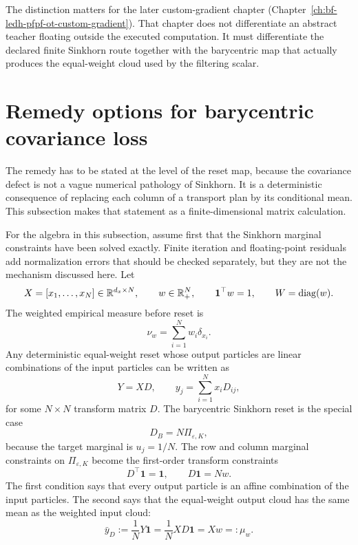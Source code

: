 The distinction matters for the later custom-gradient chapter
(Chapter~\ref{ch:bf-ledh-pfpf-ot-custom-gradient}).  That chapter does not
differentiate an abstract teacher floating outside the executed computation.  It
must differentiate the declared finite Sinkhorn route together with the barycentric
map that actually produces the equal-weight cloud used by the filtering scalar.

\section{Remedy options for barycentric covariance loss}
\label{sec:bf-eot-barycentric-remedies}

The remedy has to be stated at the level of the reset map, because the
covariance defect is not a vague numerical pathology of Sinkhorn.  It is a
deterministic consequence of replacing each column of a transport plan by its
conditional mean.  This subsection makes that statement as a finite-dimensional
matrix calculation.

For the algebra in this subsection, assume first that the Sinkhorn marginal
constraints have been solved exactly.  Finite iteration and floating-point
residuals add normalization errors that should be checked separately, but they
are not the mechanism discussed here.  Let
\[
  X = [x_1,\ldots,x_N]\in\mathbb R^{d_x\times N},
  \qquad
  w\in\mathbb R^N_+,\qquad
  \mathbf 1^\top w=1,
  \qquad
  W=\operatorname{diag}(w).
\]
The weighted empirical measure before reset is
\[
  \nu_w=\sum_{i=1}^N w_i\delta_{x_i}.
\]
Any deterministic equal-weight reset whose output particles are linear
combinations of the input particles can be written as
\begin{equation}
\label{eq:bf-eot-reset-transform}
  Y = XD,
  \qquad
  y_j=\sum_{i=1}^N x_i D_{ij},
\end{equation}
for some \(N\times N\) transform matrix \(D\).  The barycentric Sinkhorn reset is
the special case
\begin{equation}
\label{eq:bf-eot-barycentric-D}
  D_B = N\Pi_{\varepsilon,K},
\end{equation}
because the target marginal is \(u_j=1/N\).  The row and column marginal
constraints on \(\Pi_{\varepsilon,K}\) become the first-order transform
constraints
\begin{equation}
\label{eq:bf-eot-first-order-transform-contract}
  D^\top \mathbf 1 = \mathbf 1,
  \qquad
  D\mathbf 1 = Nw.
\end{equation}
The first condition says that every output particle is an affine combination of
the input particles.  The second says that the equal-weight output cloud has the
same mean as the weighted input cloud:
\begin{equation}
\label{eq:bf-eot-transform-mean}
  \bar y_D
  :=
  \frac1N Y\mathbf 1
  =
  \frac1N XD\mathbf 1
  =
  Xw
  =:
  \mu_w.
\end{equation}

